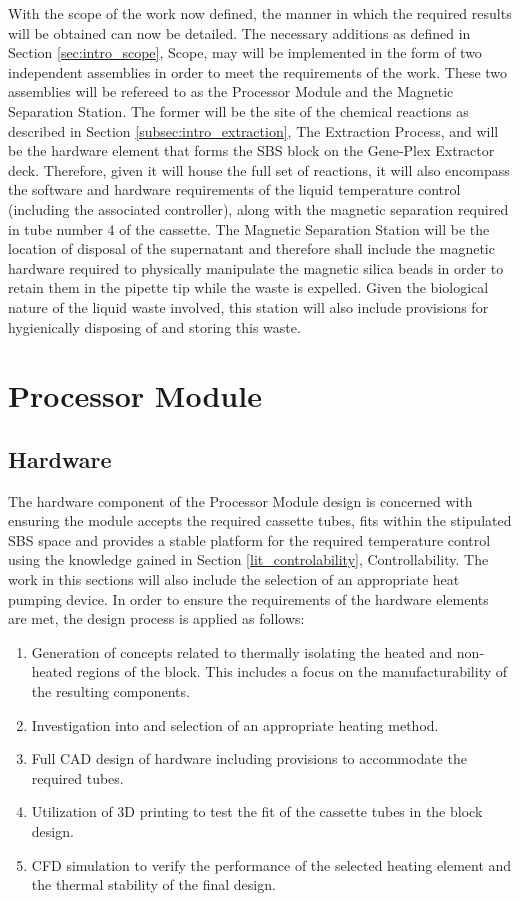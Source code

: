 With the scope of the work now defined, the manner in which the required results will be obtained can now be detailed. The necessary additions as defined in Section \ref*{sec:intro_scope}, Scope, may will be implemented in the form of two independent assemblies in order to meet the requirements of the work. These two assemblies will be refereed to as the Processor Module and the Magnetic Separation Station. The former will be the site of the chemical reactions as described in Section \ref{subsec:intro_extraction}, The Extraction Process, and will be the hardware element that forms the SBS block on the Gene-Plex Extractor deck. Therefore, given it will house the full set of reactions, it will also encompass the software and hardware requirements of the liquid temperature control (including the associated controller), along with the magnetic separation required in tube number 4 of the cassette. The Magnetic Separation Station will be the location of disposal of the supernatant and therefore shall include the magnetic hardware required to physically manipulate the magnetic silica beads in order to retain them in the pipette tip while the waste is expelled. Given the biological nature of the liquid waste involved, this station will also include provisions for hygienically disposing of and storing this waste.

\section{Processor Module}

\subsection{Hardware}

The hardware component of the Processor Module design is concerned with ensuring the module accepts the required cassette tubes, fits within the stipulated SBS space and provides a stable platform for the required temperature control using the knowledge gained in Section \ref{lit_controlability}, Controllability. The work in this sections will also include the selection of an appropriate heat pumping device. In order to ensure the requirements of the hardware elements are met, the design process is applied as follows:
\begin{enumerate}
	\item Generation of concepts related to thermally isolating the heated and non-heated regions of the block. This includes a focus on the manufacturability of the resulting components.
	\item Investigation into and selection of an appropriate heating method.
	\item Full CAD design of hardware including provisions to accommodate the required tubes.
	\item Utilization of 3D printing to test the fit of the cassette tubes in the block design.
	\item CFD simulation to verify the performance of the selected heating element and the thermal stability of the final design. 
\end{enumerate}

